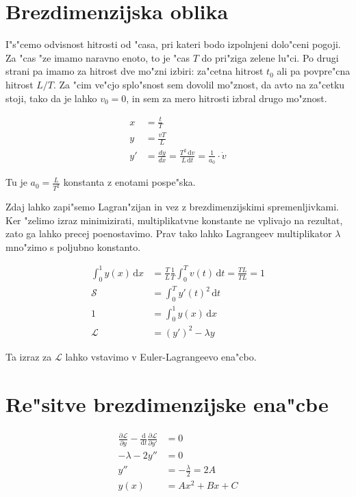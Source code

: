 \documentclass[12pt]{article}
\newcommand{\dd}{\mathrm{d}}
\begin{document}
\section{Brezdimenzijska oblika}

I"s"cemo odvisnost hitrosti od "casa, pri kateri bodo izpolnjeni dolo"ceni pogoji. Za "cas "ze imamo naravno enoto, to je "cas $T$ do pri"ziga zelene lu"ci. Po drugi strani pa imamo za hitrost dve mo"zni izbiri: za"cetna hitrost $t_0$ ali pa povpre"cna hitrost $L/T$. Za "cim ve"cjo splo"snost sem dovolil mo"znost, da avto na za"cetku stoji, tako da je lahko $v_0=0$, in sem za mero hitrosti izbral drugo mo"znost. 

\begin{align}
x &= \frac{t}{T} \\
y &= \frac{v T}{L} \\
y' &= \frac{dy}{dx} = \frac{T^2 \, \dd v}{L \, \dd t} = \frac{1}{a_0} \cdot \dot v
\end{align}

Tu je $a_0 = \frac{L}{T^2}$ konstanta z enotami pospe"ska. 

Zdaj lahko zapi"semo Lagran"zijan in vez z brezdimenzijskimi spremenljivkami. Ker "zelimo izraz minimizirati, multiplikatvne konstante ne vplivajo na rezultat, zato ga lahko precej poenostavimo. Prav tako lahko Lagrangeev multiplikator $\lambda$ mno"zimo s poljubno konstanto. 

\begin{align}
\int_0^1 y(x) \, \dd x &= \frac{T}{L} \frac{1}{T} \int_0^T v(t) \, \dd t = \frac{TL}{TL} = 1 \\
\mathcal{S} &= \int_0^T y'(t)^2 \, \dd t \\
1 &= \int_0^1 y(x) \, \dd x \\
\mathcal{L} &= (y')^2 - \lambda y
\end{align}

Ta izraz za $\mathcal{L}$ lahko vstavimo v Euler-Lagrangeevo ena"cbo. 

\section{Re"sitve brezdimenzijske ena"cbe}

\begin{align}
\frac{\partial \mathcal{L}}{\partial y} - \frac{\dd}{\dd t}\frac{\partial \mathcal L}{\partial y'} &= 0 \\
-\lambda - 2y'' &= 0 \\
y'' &= -\frac{\lambda}{2} = 2A \\
y(x) &= Ax^2 + Bx + C \label{eq:izraz-vse-spremenljivke}
\end{align}
\end{document}
